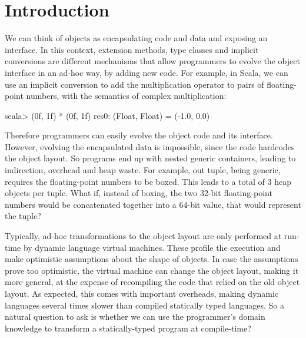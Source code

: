 \section{Introduction}
\label{sec:intro}

We can think of objects as encapsulating code and data and exposing an interface. In this context, extension methods, type classes and implicit conversions are different mechanisms that allow programmers to evolve the object interface in an ad-hoc way, by adding new code. For example, in Scala, we can use an implicit conversion to add the multiplication operator to pairs of floating-point numbers, with the semantics of complex multiplication:

\begin{lstlisting-nobreak}
scala> (0f, 1f) * (0f, 1f)
res0: (Float, Float) = (-1.0, 0.0)
\end{lstlisting-nobreak}

Therefore programmers can easily evolve the object code and its interface. However, evolving the encapsulated data is impossible, since the code hardcodes the object layout. So programs end up with nested generic containers, leading to indirection, overhead and heap waste. For example, out tuple, being generic, requires the floating-point numbers to be boxed. This leads to a total of 3 heap objects per tuple. What if, instead of boxing, the two 32-bit floating-point numbers would be concatenated together into a 64-bit value, that would represent the tuple?

Typically, ad-hoc transformations to the object layout are only performed at run-time by dynamic language virtual machines. These profile the execution and make optimistic assumptions about the shape of objects. In case the assumptions prove too optimistic, the virtual machine can change the object layout, making it more general, at the expense of recompiling the code that relied on the old object layout. As expected, this comes with important overheads, making dynamic languages several times slower than compiled statically typed languages. So a natural question to ask is whether we can use the programmer's domain knowledge to transform a statically-typed program at compile-time?

